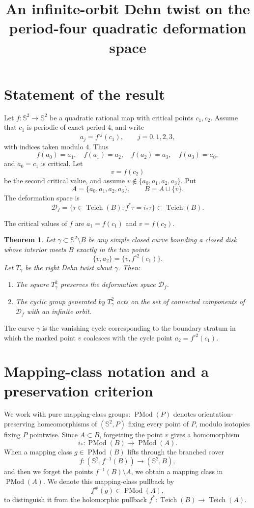 \documentclass[11pt]{article}
\title{An infinite-orbit Dehn twist on the period-four quadratic deformation space}
\author{}
\date{}
\newtheorem{theorem}{Theorem}
\newcommand{\Sph}{\mathbb S^2}
\newcommand{\Teich}{\operatorname{Teich}}
\newcommand{\D}{\mathcal D}
\newcommand{\PMod}{\operatorname{PMod}}
\begin{document}
\maketitle

\section{Statement of the result}

Let $f:\Sph\to\Sph$ be a quadratic rational map with critical points $c_1,c_2$.  
Assume that $c_1$ is periodic of exact period $4$, and write
\[
  a_j=f^{\circ j}(c_1),\qquad j=0,1,2,3,
\]
with indices taken modulo $4$.  Thus
\[
  f(a_0)=a_1,\quad f(a_1)=a_2,\quad f(a_2)=a_3,\quad f(a_3)=a_0,
\]
and $a_0=c_1$ is critical.  Let
\[
  v=f(c_2)
\]
be the second critical value, and assume $v\notin \{a_0,a_1,a_2,a_3\}$.  Put
\[
  A=\{a_0,a_1,a_2,a_3\},\qquad B=A\cup\{v\}.
\]
The deformation space is
\[
  \D_f=\{\tau\in \Teich(B): f^*\tau=i_*\tau\}\subset \Teich(B).
\]

The critical values of $f$ are $a_1=f(c_1)$ and $v=f(c_2)$.

\begin{theorem}\label{thm:main}
Let $\gamma\subset \Sph\setminus B$ be any simple closed curve bounding a closed disk whose interior meets $B$ exactly in the two points
\[
  \{v,a_2\}=\{v,f^{\circ 2}(c_1)\}.
\]
Let $T_\gamma$ be the right Dehn twist about $\gamma$.  Then:
\begin{enumerate}
  \item The square $T_\gamma^2$ preserves the deformation space $\D_f$.
  \item The cyclic group generated by $T_\gamma^2$ acts on the set of connected components of $\D_f$ with an infinite orbit.
\end{enumerate}
\end{theorem}

The curve $\gamma$ is the vanishing cycle corresponding to the boundary stratum in which the marked point $v$ coalesces with the cycle point $a_2=f^{\circ2}(c_1)$.

\section{Mapping-class notation and a preservation criterion}

We work with pure mapping-class groups: $\PMod(P)$ denotes orientation-preserving homeomorphisms of $(\Sph,P)$ fixing every point of $P$, modulo isotopies fixing $P$ pointwise.  Since $A\subset B$, forgetting the point $v$ gives a homomorphism
\[
  i_*:\PMod(B)\longrightarrow \PMod(A).
\]
When a mapping class $g\in \PMod(B)$ lifts through the branched cover
\[
  f:(\Sph,f^{-1}(B))\longrightarrow (\Sph,B),
\]
and then we forget the points $f^{-1}(B)\setminus A$, we obtain a mapping class in $\PMod(A)$.  We denote this mapping-class pullback by
\[
  f^{\#}(g)\in \PMod(A),
\]
to distinguish it from the holomorphic pullback $f^*:\Teich(B)\to\Teich(A)$.
\end{document}
